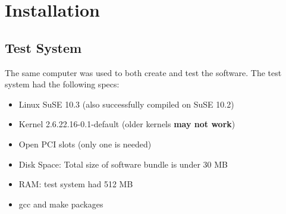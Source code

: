 \documentclass[11pt]{article}
\begin{document}



\section{Installation} \label{sec:install}

\subsection{Test System} \label{subsec:requirements}
The same computer was used to both create and test the software.
 The test system had the following specs:
\begin{itemize}
 \item Linux SuSE 10.3 (also successfully compiled on SuSE 10.2)
 \item Kernel 2.6.22.16-0.1-default (older kernels \textbf{may not work})
 \item Open PCI slots (only one is needed)
 \item Disk Space: Total size of software bundle is under 30 MB
 \item RAM: test system had 512 MB
 \item gcc and make packages
\end{itemize}
\end{document}
